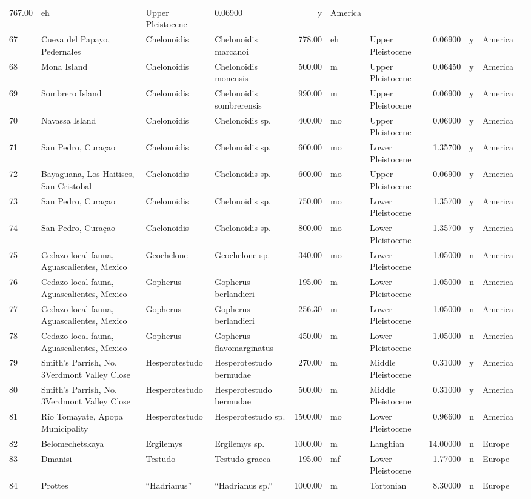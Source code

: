 \begin{landscape}
{\begin{longtable}[]{@{}llllrllrlll@{}}
	767.00 & eh & Upper Pleistocene & 0.06900 & y & America\tabularnewline
	67 & Cueva del Papayo, Pedernales & Chelonoidis & Chelonoidis marcanoi &
	778.00 & eh & Upper Pleistocene & 0.06900 & y & America\tabularnewline
	68 & Mona Island & Chelonoidis & Chelonoidis monensis & 500.00 & m &
	Upper Pleistocene & 0.06450 & y & America\tabularnewline
	69 & Sombrero Island & Chelonoidis & Chelonoidis sombrerensis & 990.00 &
	m & Upper Pleistocene & 0.06900 & y & America\tabularnewline
	70 & Navassa Island & Chelonoidis & Chelonoidis sp. & 400.00 & mo &
	Upper Pleistocene & 0.06900 & y & America\tabularnewline
	71 & San Pedro, Curaçao & Chelonoidis & Chelonoidis sp. & 600.00 & mo &
	Lower Pleistocene & 1.35700 & y & America\tabularnewline
	72 & Bayaguana, Los Haitises, San Cristobal & Chelonoidis & Chelonoidis
	sp. & 600.00 & mo & Upper Pleistocene & 0.06900 & y &
	America\tabularnewline
	73 & San Pedro, Curaçao & Chelonoidis & Chelonoidis sp. & 750.00 & mo &
	Lower Pleistocene & 1.35700 & y & America\tabularnewline
	74 & San Pedro, Curaçao & Chelonoidis & Chelonoidis sp. & 800.00 & mo &
	Lower Pleistocene & 1.35700 & y & America\tabularnewline
	75 & Cedazo local fauna, Aguascalientes, Mexico & Geochelone &
	Geochelone sp. & 340.00 & mo & Lower Pleistocene & 1.05000 & n &
	America\tabularnewline
	76 & Cedazo local fauna, Aguascalientes, Mexico & Gopherus & Gopherus
	berlandieri & 195.00 & m & Lower Pleistocene & 1.05000 & n &
	America\tabularnewline
	77 & Cedazo local fauna, Aguascalientes, Mexico & Gopherus & Gopherus
	berlandieri & 256.30 & m & Lower Pleistocene & 1.05000 & n &
	America\tabularnewline
	78 & Cedazo local fauna, Aguascalientes, Mexico & Gopherus & Gopherus
	flavomarginatus & 450.00 & m & Lower Pleistocene & 1.05000 & n &
	America\tabularnewline
	79 & Smith's Parrish, No. 3Verdmont Valley Close & Hesperotestudo &
	Hesperotestudo bermudae & 270.00 & m & Middle Pleistocene & 0.31000 & y
	& America\tabularnewline
	80 & Smith's Parrish, No. 3Verdmont Valley Close & Hesperotestudo &
	Hesperotestudo bermudae & 500.00 & m & Middle Pleistocene & 0.31000 & y
	& America\tabularnewline
	81 & Río Tomayate, Apopa Municipality & Hesperotestudo & Hesperotestudo
	sp. & 1500.00 & mo & Lower Pleistocene & 0.96600 & n &
	America\tabularnewline
	82 & Belomechetskaya & Ergilemys & Ergilemys sp. & 1000.00 & m &
	Langhian & 14.00000 & n & Europe\tabularnewline
	83 & Dmanisi & Testudo & Testudo graeca & 195.00 & mf & Lower
	Pleistocene & 1.77000 & n & Europe\tabularnewline
	84 & Prottes & ``Hadrianus'' & ``Hadrianus sp.'' & 1000.00 & m &
	Tortonian & 8.30000 & n & Europe\tabularnewline

\end{longtable}}
\end{landscape}
